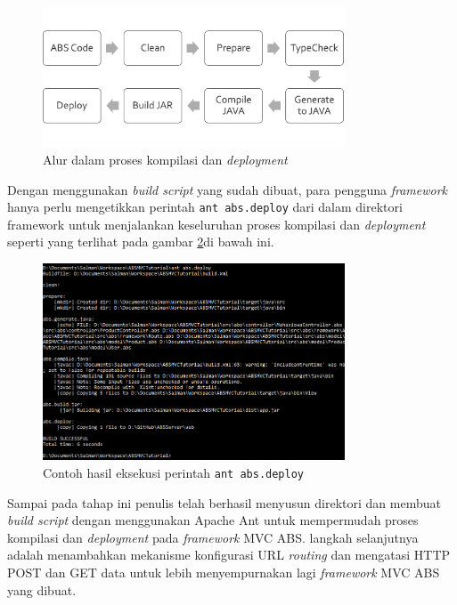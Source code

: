 \begin{figure}
    \centering
    \includegraphics[width=0.8\textwidth]{img/build-script-flow.png}
    \caption{Alur dalam proses kompilasi dan \textit{deployment}}
    \label{fig:buildScriptFlow}
\end{figure}

Dengan menggunakan \textit{build script} yang sudah dibuat, para pengguna \textit{framework} hanya perlu mengetikkan perintah \texttt{ant abs.deploy} dari dalam direktori framework untuk menjalankan keseluruhan proses kompilasi dan \textit{deployment} seperti yang terlihat pada gambar \ref{fig:antABSDeploy}di bawah ini.

\begin{figure}
    \centering
    \includegraphics[width=0.8\textwidth]{img/ant-abs-deploy.png}
    \caption{Contoh hasil eksekusi perintah \texttt{ant abs.deploy}}
    \label{fig:antABSDeploy}
\end{figure}

Sampai pada tahap ini penulis telah berhasil menyusun direktori dan membuat \textit{build script} dengan menggunakan Apache Ant untuk mempermudah proses kompilasi dan \textit{deployment} pada \textit{framework} MVC ABS. langkah selanjutnya adalah menambahkan mekanisme konfigurasi URL \textit{routing} dan mengatasi HTTP POST dan GET data untuk lebih menyempurnakan lagi \textit{framework} MVC ABS yang dibuat.

